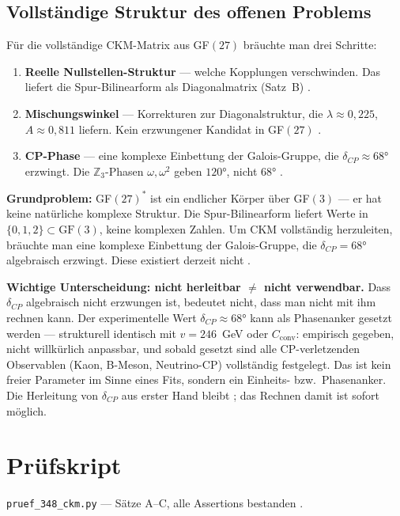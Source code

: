 \subsection{Vollständige Struktur des offenen Problems \SM}

Für die vollständige CKM-Matrix aus GF$(27)$ bräuchte man drei Schritte:

\begin{enumerate}
\item \textbf{Reelle Nullstellen-Struktur} --- welche Kopplungen verschwinden.
  Das liefert die Spur-Bilinearform als Diagonalmatrix (Satz~B) \BM.
\item \textbf{Mischungswinkel} --- Korrekturen zur Diagonalstruktur, die
  $\lambda\approx0{,}225$, $A\approx0{,}811$ liefern. Kein erzwungener
  Kandidat in GF$(27)$ \SM.
\item \textbf{CP-Phase} --- eine komplexe Einbettung der Galois-Gruppe, die
  $\delta_{CP}\approx68°$ erzwingt. Die $\mathbb{Z}_3$-Phasen $\omega,\omega^2$
  geben $120°$, nicht $68°$ \SM.
\end{enumerate}

\textbf{Grundproblem:} GF$(27)^*$ ist ein endlicher Körper über GF$(3)$ ---
er hat keine natürliche komplexe Struktur. Die Spur-Bilinearform liefert
Werte in $\{0,1,2\}\subset\mathrm{GF}(3)$, keine komplexen Zahlen.
Um CKM vollständig herzuleiten, bräuchte man eine komplexe Einbettung
der Galois-Gruppe, die $\delta_{CP}=68°$ algebraisch erzwingt.
Diese existiert derzeit nicht \SM.

\textbf{Wichtige Unterscheidung: nicht herleitbar $\neq$ nicht verwendbar.}
Dass $\delta_{CP}$ algebraisch nicht erzwungen ist, bedeutet nicht, dass man
nicht mit ihm rechnen kann. Der experimentelle Wert $\delta_{CP}\approx68°$
kann als Phasenanker gesetzt werden --- strukturell identisch mit $v=246$~GeV
oder $C_\text{conv}$: empirisch gegeben, nicht willkürlich anpassbar, und
sobald gesetzt sind alle CP-verletzenden Observablen (Kaon, B-Meson,
Neutrino-CP) vollständig festgelegt. Das ist kein freier Parameter im Sinne
eines Fits, sondern ein Einheits- bzw.\ Phasenanker.
Die Herleitung von $\delta_{CP}$ aus erster Hand bleibt \SM;
das Rechnen damit ist sofort möglich.

\section*{Prüfskript}
\texttt{pruef\_348\_ckm.py} --- Sätze A--C, alle Assertions bestanden \BM.


